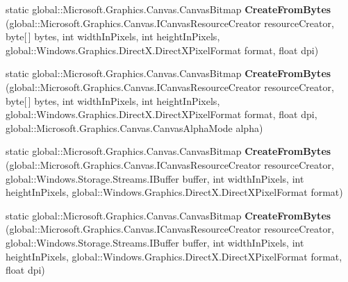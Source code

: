 \begin{DoxyCompactItemize}
\item 
\mbox{\label{class_microsoft_1_1_graphics_1_1_canvas_1_1_canvas_bitmap_a34eb9feffadf35700e66c251dd67d5fc}} 
static global\+::\+Microsoft.\+Graphics.\+Canvas.\+Canvas\+Bitmap {\bfseries Create\+From\+Bytes} (global\+::\+Microsoft.\+Graphics.\+Canvas.\+I\+Canvas\+Resource\+Creator resource\+Creator, byte\mbox{[}$\,$\mbox{]} bytes, int width\+In\+Pixels, int height\+In\+Pixels, global\+::\+Windows.\+Graphics.\+Direct\+X.\+Direct\+X\+Pixel\+Format format, float dpi)
\item 
\mbox{\label{class_microsoft_1_1_graphics_1_1_canvas_1_1_canvas_bitmap_a9681e1d684ee6e674d7512d2874c8f1b}} 
static global\+::\+Microsoft.\+Graphics.\+Canvas.\+Canvas\+Bitmap {\bfseries Create\+From\+Bytes} (global\+::\+Microsoft.\+Graphics.\+Canvas.\+I\+Canvas\+Resource\+Creator resource\+Creator, byte\mbox{[}$\,$\mbox{]} bytes, int width\+In\+Pixels, int height\+In\+Pixels, global\+::\+Windows.\+Graphics.\+Direct\+X.\+Direct\+X\+Pixel\+Format format, float dpi, global\+::\+Microsoft.\+Graphics.\+Canvas.\+Canvas\+Alpha\+Mode alpha)
\item 
\mbox{\label{class_microsoft_1_1_graphics_1_1_canvas_1_1_canvas_bitmap_a2168a3d89e47f661342d1550456b8f68}} 
static global\+::\+Microsoft.\+Graphics.\+Canvas.\+Canvas\+Bitmap {\bfseries Create\+From\+Bytes} (global\+::\+Microsoft.\+Graphics.\+Canvas.\+I\+Canvas\+Resource\+Creator resource\+Creator, global\+::\+Windows.\+Storage.\+Streams.\+I\+Buffer buffer, int width\+In\+Pixels, int height\+In\+Pixels, global\+::\+Windows.\+Graphics.\+Direct\+X.\+Direct\+X\+Pixel\+Format format)
\item 
\mbox{\label{class_microsoft_1_1_graphics_1_1_canvas_1_1_canvas_bitmap_af1daa19ada592de34b02ac1e97e88606}} 
static global\+::\+Microsoft.\+Graphics.\+Canvas.\+Canvas\+Bitmap {\bfseries Create\+From\+Bytes} (global\+::\+Microsoft.\+Graphics.\+Canvas.\+I\+Canvas\+Resource\+Creator resource\+Creator, global\+::\+Windows.\+Storage.\+Streams.\+I\+Buffer buffer, int width\+In\+Pixels, int height\+In\+Pixels, global\+::\+Windows.\+Graphics.\+Direct\+X.\+Direct\+X\+Pixel\+Format format, float dpi)
\item 

\end{DoxyCompactItemize}
